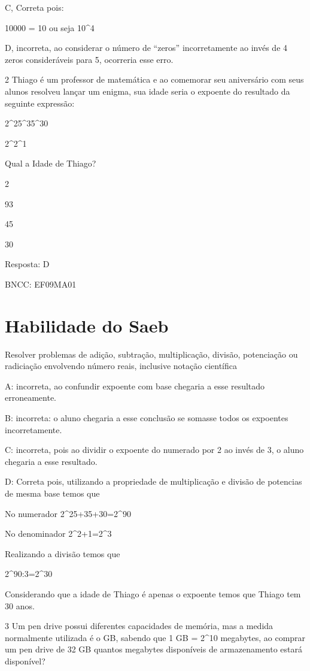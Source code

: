 C, Correta pois:

10000 =
10 ou
seja 10^4

D, incorreta, ao considerar o número de ``zeros'' incorretamente ao
invés de 4 zeros consideráveis para 5, ocorreria esse erro.

\num{2} Thiago é um professor de matemática e ao comemorar seu aniversário
com seus alunos resolveu lançar um enigma, sua idade seria o expoente do
resultado da seguinte expressão:

2^25^35^30

2^2^1

Qual a Idade de Thiago?

\item 2
\item 93
\item 45
\item 30

Resposta: D

BNCC: EF09MA01

\section{Habilidade do Saeb}

Resolver problemas de adição, subtração, multiplicação, divisão,
potenciação ou radiciação envolvendo número reais, inclusive notação
científica

A: incorreta, ao confundir expoente com base chegaria a esse resultado
erroneamente.

B: incorreta: o aluno chegaria a esse conclusão se somasse todos os
expoentes incorretamente.

C: incorreta, pois ao dividir o expoente do numerado por 2 ao invés de
3, o aluno chegaria a esse resultado.

D: Correta pois, utilizando a propriedade de multiplicação e divisão de
potencias de mesma base temos que

No numerador 2^25+35+30=2^90

No denominador 2^2+1=2^3

Realizando a divisão temos que

2^90:3=2^30

Considerando que a idade de Thiago é apenas o expoente temos que Thiago
tem 30 anos.

\num{3} Um pen drive possui diferentes capacidades de memória, mas a medida
normalmente utilizada é o GB, sabendo que 1 GB = 2^10
megabytes, ao comprar um pen drive de 32 GB quantos megabytes
disponíveis de armazenamento estará disponível?

